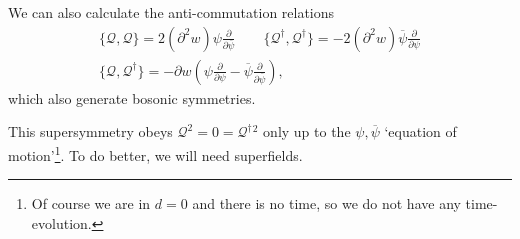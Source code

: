 We can also calculate the anti-commutation relations
\begin{equation}
  \begin{gathered}
    \{\mathcal{Q} , \mathcal{Q}\} = 2 (\partial^2 w) \psi \frac{\partial }{\partial \overline{\psi}} \qquad 
    \{\mathcal{Q}^{\dagger}, \mathcal{Q}^{\dagger}\} = - 2 (\partial^2 w) \overline{\psi} \frac{\partial }{\partial \psi} \\
  \{\mathcal{Q}, \mathcal{Q}^{\dagger}\} = - \partial w \left( \psi \frac{\partial }{\partial \psi} - \overline{\psi} \frac{\partial }{\partial \overline{\psi}} \right),
  \end{gathered}
\end{equation}
which also generate bosonic symmetries.

This supersymmetry obeys $\mathcal{Q}^2 = 0 = \mathcal{Q}^{\dagger}{}^2$ only up to the $\psi, \overline{\psi}$ `equation of motion'\footnote{Of course we are in $d=0$ and there is no time, so we do not have any time-evolution.}. To do better, we will need superfields.

